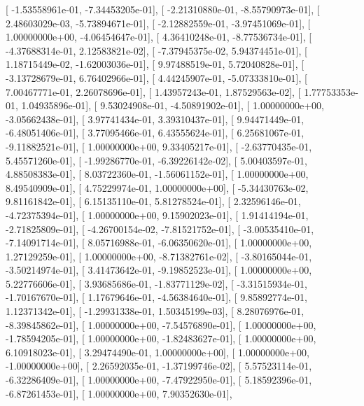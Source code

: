 \documentclass{article}
\begin{document}
       [ -1.53558961e-01,  -7.34453205e-01],
       [ -2.21310880e-01,  -8.55790973e-01],
       [  2.48603029e-03,  -5.73894671e-01],
       [ -2.12882559e-01,  -3.97451069e-01],
       [  1.00000000e+00,  -4.06454647e-01],
       [  4.36410248e-01,  -8.77536734e-01],
       [ -4.37688314e-01,   2.12583821e-02],
       [ -7.37945375e-02,   5.94374451e-01],
       [  1.18715449e-02,  -1.62003036e-01],
       [  9.97488519e-01,   5.72040828e-01],
       [ -3.13728679e-01,   6.76402966e-01],
       [  4.44245907e-01,  -5.07333810e-01],
       [  7.00467771e-01,   2.26078696e-01],
       [  1.43957243e-01,   1.87529563e-02],
       [  1.77753353e-01,   1.04935896e-01],
       [  9.53024908e-01,  -4.50891902e-01],
       [  1.00000000e+00,  -3.05662438e-01],
       [  3.97741434e-01,   3.39310437e-01],
       [  9.94471449e-01,  -6.48051406e-01],
       [  3.77095466e-01,   6.43555624e-01],
       [  6.25681067e-01,  -9.11882521e-01],
       [  1.00000000e+00,   9.33405217e-01],
       [ -2.63770435e-01,   5.45571260e-01],
       [ -1.99286770e-01,  -6.39226142e-02],
       [  5.00403597e-01,   4.88508383e-01],
       [  8.03722360e-01,  -1.56061152e-01],
       [  1.00000000e+00,   8.49540909e-01],
       [  4.75229974e-01,   1.00000000e+00],
       [ -5.34430763e-02,   9.81161842e-01],
       [  6.15135110e-01,   5.81278524e-01],
       [  2.32596146e-01,  -4.72375394e-01],
       [  1.00000000e+00,   9.15902023e-01],
       [  1.91414194e-01,  -2.71825809e-01],
       [ -4.26700154e-02,  -7.81521752e-01],
       [ -3.00535410e-01,  -7.14091714e-01],
       [  8.05716988e-01,  -6.06350620e-01],
       [  1.00000000e+00,   1.27129259e-01],
       [  1.00000000e+00,  -8.71382761e-02],
       [ -3.80165044e-01,  -3.50214974e-01],
       [  3.41473642e-01,  -9.19852523e-01],
       [  1.00000000e+00,   5.22776606e-01],
       [  3.93685686e-01,  -1.83771129e-02],
       [ -3.31515934e-01,  -1.70167670e-01],
       [  1.17679646e-01,  -4.56384640e-01],
       [  9.85892774e-01,   1.12371342e-01],
       [ -1.29931338e-01,   1.50345199e-03],
       [  8.28076976e-01,  -8.39845862e-01],
       [  1.00000000e+00,  -7.54576890e-01],
       [  1.00000000e+00,  -1.78594205e-01],
       [  1.00000000e+00,  -1.82483627e-01],
       [  1.00000000e+00,   6.10918023e-01],
       [  3.29474490e-01,   1.00000000e+00],
       [  1.00000000e+00,  -1.00000000e+00],
       [  2.26592035e-01,  -1.37199746e-02],
       [  5.57523114e-01,  -6.32286409e-01],
       [  1.00000000e+00,  -7.47922950e-01],
       [  5.18592396e-01,  -6.87261453e-01],
       [  1.00000000e+00,   7.90352630e-01],
\end{document}

